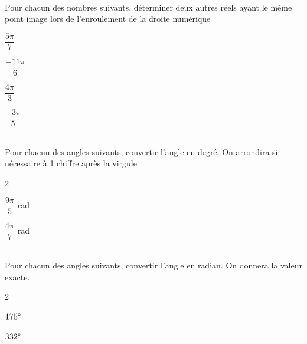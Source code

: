 \documentclass[a4paper,11pt]{article}        %
\begin{document}
\\
Pour chacun des nombres suivants, déterminer deux autres réels ayant le même point image lors de l'enroulement de la droite numérique
\begin{enumMet}
	\item $\dfrac{5\pi}{7}$ \quad  {}
	\item $\dfrac{-11\pi}{6}$ \quad  {}
	\item $\dfrac{4\pi}{3}$ \quad  {}
	\item $\dfrac{-3\pi}{5}$\quad  {}
\end{enumMet}

\\
Pour chacun des angles suivants, convertir l'angle en degré. On arrondira si nécessaire à 1 chiffre après la virgule
\begin{multicols}{2}
	\begin{enumMet}
		\item $\dfrac{9\pi}{5}$ rad \quad {}
		\item $\dfrac{4\pi}{7}$ rad  \quad {}
	\end{enumMet}
\end{multicols}

\\
Pour chacun des angles suivants, convertir l'angle en radian. On donnera la valeur exacte.
\begin{multicols}{2}
	\begin{enumMet}
		\item $175\degree$ \quad \corr{$=175\times \dfrac{\pi}{180}=\dfrac{35\pi}{36}$ rad}
		\item $332\degree$ \quad \corr{$=332\times \dfrac{\pi}{180}=\dfrac{83\pi}{45}$ rad}
	\end{enumMet}
\end{multicols}
\end{document}
